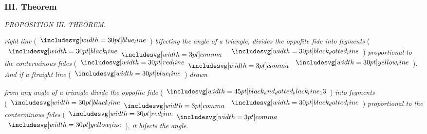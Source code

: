 \documentclass[11pt,preview]{standalone}
\begin{document}
\subsubsection{III. Theorem}

\begin{minipage}[t]{0.43\textwidth}
    \vspace{20pt}
    
\end{minipage}%
\hfill
\begin{minipage}[t]{0.54\textwidth}
    \begin{center}
        \textit{PROPOSITION III. THEOREM.}\label{book6pr3} \\
    \end{center}

    \hfill

    \begin{center}
        \raggedright \lettrine[lines=3, loversize=1, nindent=0pt]{}{} \textit{right line} (\hspace{-1ex}$\blueline$\hspace{-1ex}) \textit{biſecting the angle of a triangle, divides the oppoſite ſide into ſegments} (\hspace{-1ex}$\blackline \bcomma$ $\dottedblackline$\hspace{-1ex}) \textit{proportional to the conterminous ſides} (\hspace{-1ex}$\redline \bcomma \yellowline$\hspace{-1ex}). \textit{And if a ſtraight line} (\hspace{-1ex}$\blueline$\hspace{-1ex}) \textit{drawn}
    \end{center}
\end{minipage}
\raggedright \textit{from any angle of a triangle divide the oppoſite ſide} (\hspace{-1ex}$\bimg{black_and_dotted_black_line_13}$\hspace{-1ex}) \textit{into ſegments}\\ (\hspace{-1ex}$\blackline \bcomma \dottedblackline$\hspace{-1ex}) \textit{proportional to the conterminous ſides} (\hspace{-1ex}$\redline \bcomma$\\ $\yellowline$\hspace{-1ex}), \textit{it biſects the angle}.
\end{document}
